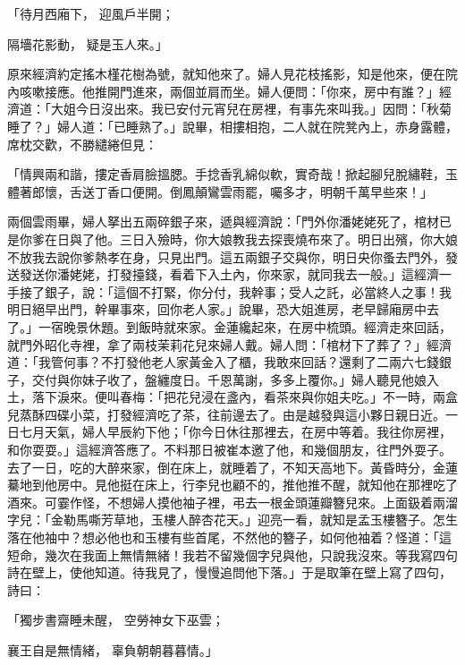 「待月西廂下，  迎風戶半開；

隔墻花影動，  疑是玉人來。」

原來經濟約定搖木槿花樹為號，就知他來了。婦人見花枝搖影，知是他來，便在院內咳嗽接應。他推開門進來，兩個並肩而坐。婦人便問：「你來，房中有誰？」經濟道：「大姐今日沒出來。我已安付元宵兒在房裡，有事先來叫我。」因問：「秋菊睡了？」婦人道：「已睡熟了。」說畢，相摟相抱，二人就在院凳內上，赤身露體，席枕交歡，不勝繾綣但見：

「情興兩和諧，摟定香肩臉搵腮。手捻香乳綿似軟，實奇哉！掀起腳兒脫繡鞋，玉體著郎懷，舌送丁香口便開。倒鳳顛鸞雲雨罷，囑多才，明朝千萬早些來！」

兩個雲雨畢，婦人拏出五兩碎銀子來，遞與經濟說：「門外你潘姥姥死了，棺材已是你爹在日與了他。三日入殮時，你大娘教我去探喪燒布來了。明日出殯，你大娘不放我去說你爹熱孝在身，只見出門。這五兩銀子交與你，明日央你蚤去門外，發送發送你潘姥姥，打發擡錢，看着下入土內，你來家，就同我去一般。」這經濟一手接了銀子，說：「這個不打緊，你分付，我幹事；受人之託，必當終人之事！我明日絕早出門，幹畢事來，回你老人家。」說畢，恐大姐進房，老早歸廂房中去了。」一宿晚景休題。到飯時就來家。金蓮纔起來，在房中梳頭。經濟走來回話，就門外昭化寺裡，拿了兩枝茉莉花兒來婦人戴。婦人問：「棺材下了葬了？」經濟道：「我管何事？不打發他老人家黃金入了櫃，我敢來回話？還剩了二兩六七錢銀子，交付與你妹子收了，盤纏度日。千恩萬謝，多多上覆你。」婦人聽見他娘入土，落下淚來。便叫春梅：「把花兒浸在盞內，看茶來與你姐夫吃。」不一時，兩盒兒蒸酥四碟小菜，打發經濟吃了茶，往前邊去了。由是越發與這小夥日親日近。一日七月天氣，婦人早辰約下他；「你今日休往那裡去，在房中等着。我往你房裡，和你耍耍。」這經濟答應了。不料那日被崔本邀了他，和幾個朋友，往門外耍子。去了一日，吃的大醉來家，倒在床上，就睡着了，不知天高地下。黃昏時分，金蓮驀地到他房中。見他挺在床上，行李兒也顧不的，推他推不醒，就知他在那裡吃了酒來。可霎作怪，不想婦人摸他袖子裡，弔去一根金頭蓮瓣簪兒來。上面鈒着兩溜字兒：「金勒馬嘶芳草地，玉樓人醉杏花天。」迎亮一看，就知是孟玉樓簪子。怎生落在他袖中？想必他也和玉樓有些首尾，不然他的簪子，如何他袖着？怪道：「這短命，幾次在我面上無情無緒！我若不留幾個字兒與他，只說我沒來。等我寫四句詩在壁上，使他知道。待我見了，慢慢追問他下落。」于是取筆在壁上寫了四句，詩曰：

「獨步書齋睡未醒，  空勞神女下巫雲；

襄王自是無情緒，  辜負朝朝暮暮情。」

